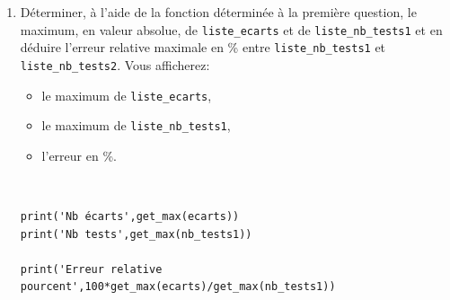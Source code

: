 \begin{enumerate}
\item Déterminer, à l'aide de la fonction déterminée à la première question, le maximum, en valeur absolue, de \verb?liste_ecarts? et de \verb?liste_nb_tests1? et en déduire l'erreur relative maximale en \% entre \verb?liste_nb_tests1? et \verb?liste_nb_tests2?. Vous afficherez:
\begin{itemize}
 \item le maximum de \verb?liste_ecarts?,
 \item le maximum de \verb?liste_nb_tests1?,
 \item l'erreur en \%.
\end{itemize}


\begin{solution}~\ \\
\begin{verbatim}
print('Nb écarts',get_max(ecarts))
print('Nb tests',get_max(nb_tests1))

print('Erreur relative pourcent',100*get_max(ecarts)/get_max(nb_tests1))
\end{verbatim}
\end{solution}

\end{enumerate}

